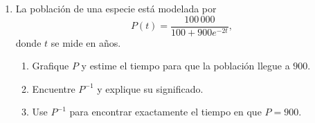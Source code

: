 \begin{prob}
\begin{enumerate}
  \item La población de una especie está modelada por
    \[
      P(t) = \frac{100\,000}{100 + 900e^{-2t}},
    \]
    donde $t$ se mide en años.
    \begin{enumerate}
      \item Grafique $P$ y estime el tiempo para que la población llegue a $900$.
      \item Encuentre $P^{-1}$ y explique su significado.
      \item Use $P^{-1}$ para encontrar exactamente el tiempo en que $P = 900$.
    \end{enumerate}
\end{enumerate}
\end{prob}

